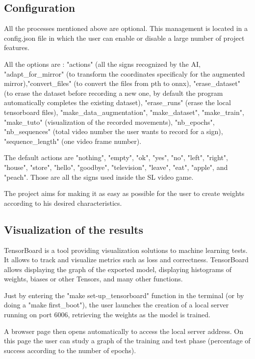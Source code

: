\subsection{Configuration}

All the processes mentioned above are optional. This management is located in a config.json file in which the user can enable or disable a large number of project features. 

All the options are : "actions" (all the signs recognized by the AI, "adapt\_for\_mirror" (to transform the coordinates specificaly for the augmented mirror),"convert\_files" (to convert the files from pth to onnx), "erase\_dataset" (to erase the dataset before recording a new one, by default the program automatically completes the existing dataset), "erase\_runs" (erase the local tensorboard files), "make\_data\_augmentation", "make\_dataset", "make\_train", "make\_tuto"  (visualization of the recorded movements), "nb\_epochs", "nb\_sequences" (total video number the user wants to record for a sign), "sequence\_length" (one video frame number).

The default actions are "nothing", "empty", "ok", "yes", "no", "left", "right", "house", "store", "hello", "goodbye", "television", "leave", "eat", "apple", and "peach". Those are all the signs used inside the SL video game.

The project aims for making it as easy as possible for the user to create weights according to his desired characteristics.

\subsection{Visualization of the results}

TensorBoard is a tool providing visualization solutions to machine learning tests. It allows to track and visualize metrics such as loss and correctness. TensorBoard allows displaying the graph of the exported model, displaying histograms of weights, biases or other Tensors, and many other functions.

Just by entering the "make set-up\_tensorboard" function in the terminal (or by doing a "make first\_boot"), the user launches the creation of a local server running on port 6006, retrieving the weights as the model is trained. 

A browser page then opens automatically to access the local server address. On this page the user can study a graph of the training and test phase (percentage of success according to the number of epochs). 

